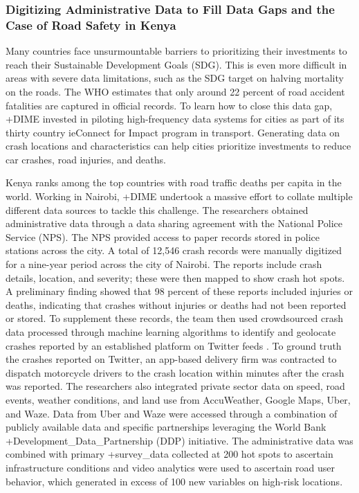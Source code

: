 \documentclass[
]{book}
\begin{document}
\hypertarget{digitizing-administrative-data-to-fill-data-gaps-and-the-case-of-road-safety-in-kenya}{%
\subsubsection{Digitizing Administrative Data to Fill Data Gaps and the Case of Road Safety in Kenya}\label{digitizing-administrative-data-to-fill-data-gaps-and-the-case-of-road-safety-in-kenya}}

Many countries face unsurmountable barriers to prioritizing their investments to reach their Sustainable Development Goals (SDG). This is even more difficult in areas with severe data limitations, such as the SDG target on halving mortality on the roads. The WHO estimates that only around 22 percent of road accident fatalities are captured in official records. To learn how to close this data gap, +DIME\textbar{} invested in piloting high-frequency data systems for cities as part of its thirty country ieConnect for Impact program in transport. Generating data on crash locations and characteristics can help cities prioritize investments to reduce car crashes, road injuries, and deaths.

Kenya ranks among the top countries with road traffic deaths per capita in the world. Working in Nairobi, +DIME\textbar{} undertook a massive effort to collate multiple different data sources to tackle this challenge. The researchers obtained administrative data through a data sharing agreement with the National Police Service (NPS). The NPS provided access to paper records stored in police stations across the city. A total of 12,546 crash records were manually digitized for a nine-year period across the city of Nairobi. The reports include crash details, location, and severity; these were then mapped to show crash hot spots. A preliminary finding showed that 98 percent of these reports included injuries or deaths, indicating that crashes without injuries or deaths had not been reported or stored. To supplement these records, the team then used crowdsourced crash data processed through machine learning algorithms to identify and geolocate crashes reported by an established platform on Twitter feeds \citep{milusheva2020}. To ground truth the crashes reported on Twitter, an app-based delivery firm was contracted to dispatch motorcycle drivers to the crash location within minutes after the crash was reported. The researchers also integrated private sector data on speed, road events, weather conditions, and land use from AccuWeather, Google Maps, Uber, and Waze. Data from Uber and Waze were accessed through a combination of publicly available data and specific partnerships leveraging the World Bank +Development\_Data\_Partnership\textbar{} (DDP) initiative. The administrative data was combined with primary +survey\_data\textbar{} collected at 200 hot spots to ascertain infrastructure conditions and video analytics were used to ascertain road user behavior, which generated in excess of 100 new variables on high-risk locations.
\end{document}

